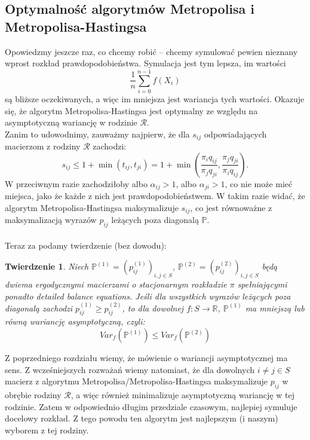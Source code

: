 \documentclass[a4paper]{article}
\theoremstyle{defn}
\theoremstyle{theorem}
\newtheorem{theorem}[defn]{Twierdzenie}
\theoremstyle{lemma}
\theoremstyle{cor}
\theoremstyle{fact}
\begin{document}
\subsection{Optymalność algorytmów Metropolisa i Metropolisa-Hastingsa}
Opowiedzmy jeszcze raz, co chcemy robić – chcemy symulować pewien nieznany wprost rozkład prawdopodobieństwa. Symulacja jest tym lepsza, im wartości $$\frac{1}{n}\sum\limits_{i = 0}^{n-1} f(X_i)$$
są bliższe oczekiwanych, a więc im mniejsza jest wariancja tych wartości. Okazuje się, że algorytm Metropolisa-Hastingsa jest optymalny ze względu na asymptotyczną wariancję w rodzinie $\mathcal{R}$.\\

Zanim to udowodnimy, zauważmy najpierw, że dla $s_{ij}$ odpowiadających macierzom z rodziny $\mathcal{R}$ zachodzi:
$$s_{ij} \leq 1 + \min(t_{ij}, t_{ji}) = 1 + \min\left(\frac{\pi_i q_{ij}}{\pi_j q_{ji}}, \frac{\pi_j q_{ji}}{\pi_i q_{ij}}\right).$$
W przeciwnym razie zachodziłoby albo $\alpha_{ij} > 1$, albo $\alpha_{ji} > 1$, co nie może mieć miejsca, jako że każde z nich jest prawdopodobieństwem. W takim razie widać, że algorytm Metropolisa-Hastingsa maksymalizuje $s_{ij}$, co jest równoważne z maksymalizacją wyrazów $p_{ij}$ leżących poza diagonalą $\mathbb{P}$.\\\\
Teraz za \cite{peskun} podamy twierdzenie (bez dowodu): \\
\begin{theorem}
Niech $\mathbb{P}^{(1)} = (p_{ij}^{(1)})_{i,j \in S}$, $\mathbb{P}^{(2)}= (p_{ij}^{(2)})_{i,j \in S}$ będą dwiema ergodycznymi macierzami o stacjonarnym rozkładzie $\pi$ spełniającymi ponadto \textit{detailed balance equations}. Jeśli dla wszystkich wyrazów leżących poza diagonalą zachodzi $p_{ij}^{(1)} \geq p_{ij}^{(2)}$, to dla dowolnej $f: S \to \mathbb{R}$,  $\mathbb{P}^{(1)}$ ma mniejszą lub równą wariancję asymptotyczną, czyli:
$$Var_f(\mathbb{P}^{(1)}) \leq Var_f(\mathbb{P}^{(2)})$$
\end{theorem}
Z poprzedniego rozdziału wiemy, że mówienie o wariancji asymptotycznej ma sens. Z wcześniejszych rozważań wiemy natomiast, że dla dowolnych $i \neq j \in S$ macierz z algorytmu Metropolisa/Metropolisa-Hastingsa maksymalizuje $p_{ij}$ w obrębie rodziny $\mathcal{R}$, a więc również minimalizuje asymptotyczną wariancję w tej rodzinie. Zatem w odpowiednio długim przedziale czasowym, najlepiej symuluje docelowy rozkład. Z tego powodu ten algorytm jest najlepszym (i naszym) wyborem z tej rodziny. \\
\end{document}
